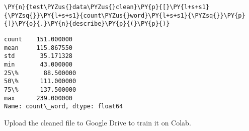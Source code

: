 \documentclass[../main.tex]{subfiles}
\begin{document}
    \begin{tcolorbox}[breakable, size=fbox, boxrule=1pt, pad at break*=1mm,colback=cellbackground, colframe=cellborder]
\begin{Verbatim}[commandchars=\\\{\}]
\PY{n}{test\PYZus{}data\PYZus{}clean}\PY{p}{[}\PY{l+s+s1}{\PYZsq{}}\PY{l+s+s1}{count\PYZus{}word}\PY{l+s+s1}{\PYZsq{}}\PY{p}{]}\PY{o}{.}\PY{n}{describe}\PY{p}{(}\PY{p}{)}
\end{Verbatim}
\end{tcolorbox}

            \begin{tcolorbox}[breakable, size=fbox, boxrule=.5pt, pad at break*=1mm, opacityfill=0]
\begin{Verbatim}[commandchars=\\\{\}]
count    151.000000
mean     115.867550
std       35.171328
min       43.000000
25\%       88.500000
50\%      111.000000
75\%      137.500000
max      239.000000
Name: count\_word, dtype: float64
\end{Verbatim}
\end{tcolorbox}
        
    Upload the cleaned file to Google Drive to train it on Colab.
    
\end{document}
